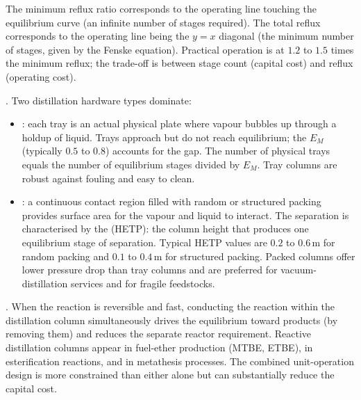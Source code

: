 The minimum reflux ratio corresponds to the operating line touching
the equilibrium curve (an infinite number of stages required). The
total reflux corresponds to the operating line being the $y = x$
diagonal (the minimum number of stages, given by the Fenske equation).
Practical operation is at $1.2$ to $1.5$ times the minimum reflux;
the trade-off is between stage count (capital cost) and reflux
(operating cost).

. Two distillation hardware types
dominate:

\begin{itemize}[leftmargin=*]
  \item {}: each tray is an actual physical
    plate where vapour bubbles up through a holdup of liquid. Trays
    approach but do not reach equilibrium; the  $E_M$ (typically $0.5$ to $0.8$) accounts for
    the gap. The number of physical trays equals the number of
    equilibrium stages divided by $E_M$. Tray columns are robust
    against fouling and easy to clean.
  \item {}: a continuous contact region filled
    with random or structured packing provides surface area for the
    vapour and liquid to interact. The separation is characterised by
    the  (HETP):
    the column height that produces one equilibrium stage of
    separation. Typical HETP values are $0.2$ to $0.6\,\text{m}$ for
    random packing and $0.1$ to $0.4\,\text{m}$ for structured
    packing. Packed columns offer lower pressure drop than tray
    columns and are preferred for vacuum-distillation services and
    for fragile feedstocks.
\end{itemize}

. When the reaction is reversible and
fast, conducting the reaction within the distillation column
simultaneously drives the equilibrium toward products (by removing
them) and reduces the separate reactor requirement. Reactive
distillation columns appear in fuel-ether production (MTBE, ETBE),
in esterification reactions, and in metathesis processes. The
combined unit-operation design is more constrained than either
alone but can substantially reduce the capital cost.

